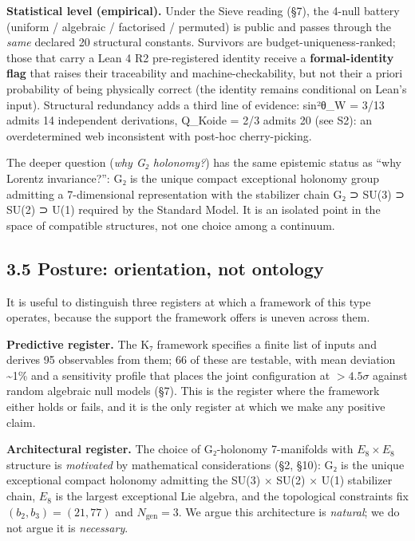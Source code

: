 \documentclass[11pt,a4paper]{article}
\begin{document}
\textbf{Statistical level (empirical).} Under the Sieve reading (§7), the 4-null battery (uniform / algebraic / factorised / permuted) is public and passes through the \emph{same} declared 20 structural constants. Survivors are budget-uniqueness-ranked; those that carry a Lean 4 R2 pre-registered identity receive a \textbf{formal-identity flag} that raises their traceability and machine-checkability, but not their a priori probability of being physically correct (the identity remains conditional on Lean's input). Structural redundancy adds a third line of evidence: sin²θ\_\allowbreak{}W = 3/13 admits 14 independent derivations, Q\_\allowbreak{}Koide = 2/3 admits 20 (see S2): an overdetermined web inconsistent with post-hoc cherry-picking.

The deeper question (\emph{why G₂ holonomy?}) has the same epistemic status as ``why Lorentz invariance?'': G₂ is the unique compact exceptional holonomy group admitting a 7-dimensional representation with the stabilizer chain G₂ ⊃ SU(3) ⊃ SU(2) ⊃ U(1) required by the Standard Model. It is an isolated point in the space of compatible structures, not one choice among a continuum.

\subsection{3.5 Posture: orientation, not ontology}\label{posture-orientation-not-ontology}

It is useful to distinguish three registers at which a framework of this type operates, because the support the framework offers is uneven across them.

\textbf{Predictive register.} The K₇ framework specifies a finite list of inputs and derives 95 observables from them; 66 of these are testable, with mean deviation \textasciitilde1\% and a sensitivity profile that places the joint configuration at \(> 4.5\sigma\) against random algebraic null models (§7). This is the register where the framework either holds or fails, and it is the only register at which we make any positive claim.

\textbf{Architectural register.} The choice of G₂-holonomy 7-manifolds with \(E_8 \times E_8\) structure is \emph{motivated} by mathematical considerations (§2, §10): G₂ is the unique exceptional compact holonomy admitting the SU(3) × SU(2) × U(1) stabilizer chain, \(E_8\) is the largest exceptional Lie algebra, and the topological constraints fix \((b_2, b_3) = (21, 77)\) and \(N_{\mathrm{gen}} = 3\). We argue this architecture is \emph{natural}; we do not argue it is \emph{necessary}.
\end{document}
